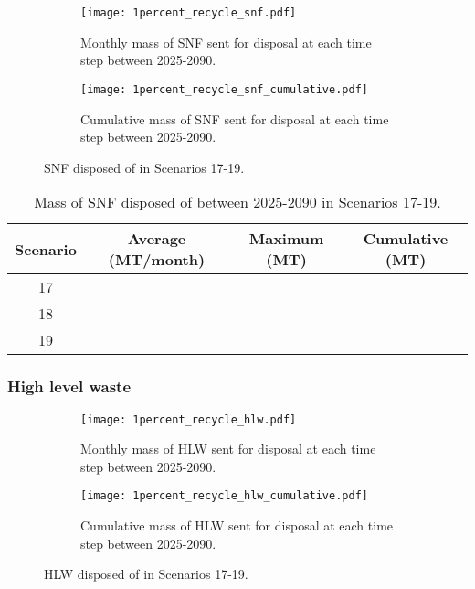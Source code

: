 \begin{figure}[h!]
    \centering
    \begin{subfigure}[b]{0.49\textwidth}
        \centering
        \texttt{[image: 1percent\_recycle\_snf.pdf]}
        \caption{Monthly mass of SNF sent for disposal 
        at each time step between 2025-2090.}
        \label{fig:1percent_recycle_snf_all}
    \end{subfigure}
    \hfill
    \begin{subfigure}[b]{0.49\textwidth}
        \centering
        \texttt{[image: 1percent\_recycle\_snf\_cumulative.pdf]}
        \caption{Cumulative mass of SNF sent for disposal 
        at each time step between 2025-2090.}
        \label{fig:1percent_recycle_snf_cumulative}
    \end{subfigure}
       \caption{\gls{SNF} disposed of in Scenarios 17-19.}
       \label{fig:1percent_recycle_snf}
\end{figure}

\begin{table}[h!]
    \centering 
    \caption{Mass of SNF disposed of between 2025-2090 in 
    Scenarios 17-19.}
    \label{tab:snf_17-19}
    \begin{tabular}{c c c c}
        \hline 
        Scenario & Average (MT/month) & Maximum (MT) & Cumulative (MT) \\
        \hline
        17 & & & \\
        18 & & & \\
        19 & & & \\
        \hline
    \end{tabular}
\end{table}


\subsubsection{High level waste}

\begin{figure}[h!]
    \centering
    \begin{subfigure}[b]{0.49\textwidth}
        \centering
        \texttt{[image: 1percent\_recycle\_hlw.pdf]}
        \caption{Monthly mass of HLW sent for disposal 
        at each time step between 2025-2090.}
        \label{fig:1percent_recycle_hlw_all}
    \end{subfigure}
    \hfill
    \begin{subfigure}[b]{0.49\textwidth}
        \centering
        \texttt{[image: 1percent\_recycle\_hlw\_cumulative.pdf]}
        \caption{Cumulative mass of HLW sent for disposal 
        at each time step between 2025-2090.}
        \label{fig:1percent_recycle_hlw_cumulative}
    \end{subfigure}
       \caption{\gls{HLW} disposed of in Scenarios 17-19.}
       \label{fig:1percent_recycle_hlw}
\end{figure}

